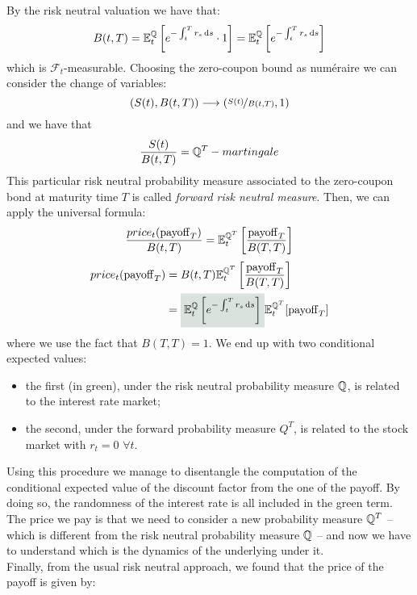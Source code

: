 \medbreak
\noindent By the risk neutral valuation we have that:
\begin{equation}
    B(t,T) = \mathbb{E}^{\mathbb{Q}}_t\left[e^{-\int_t^T r_s\,\dd s}\cdot 1\right] = \mathbb{E}^{\mathbb{Q}}_t\left[e^{-\int_t^T r_s\,\dd s}\right] 
\end{equation}
which is $\mathcal{F}_t$-measurable. Choosing the zero-coupon bound as numéraire we can consider the change of variables:
\begin{equation}
    (S(t), B(t,T)) \longrightarrow (\nicefrac{S(t)}{B(t,T)},1)
\end{equation}
and we have that 
\begin{equation}
    \dfrac{S(t)}{B(t,T)} = \mathbb{Q}^T-martingale
\end{equation}
This particular risk neutral probability measure associated to the zero-coupon bond at maturity time $T$ is called \emph{forward risk neutral measure}. Then, we can apply the universal formula:
\begin{align}
    \frac{price_t(\operatorname{payoff}_T)}{B(t,T)} = \mathbb{E}^{\mathbb{Q}^T}_t\left[\frac{\operatorname{payoff}_T}{B(T,T)}\right] 
\end{align}
\begin{align}
    \notag price_t(\pay_T) &= B(t,T) \mathbb{E}^{\Qmeas^T}_t\left[\frac{\pay_T}{B(T,T)}\right] \\
    &=
    \hlc{mytweed}{\expect_t\left[e^{-\int_t^T r_s\,\dd s}\right]} \mathbb{E}^{\Qmeas^T}_t[\pay_T]
\end{align}
where we use the fact that $B(T,T)=1$. We end up with two conditional expected values:
\begin{itemize}
    \item the first (in green), under the risk neutral probability measure $\mathbb{Q}$, is related to the interest rate market;
    \item the second, under the forward probability measure $Q^T$, is related to the stock market with $r_t = 0$ $\forall t$.
\end{itemize}
Using this procedure we manage to disentangle the computation of the conditional expected value of the discount factor from the one of the payoff. By doing so, the randomness of the interest rate is all included in the green term. The price we pay is that we need to consider a new probability measure $\mathbb{Q}^T$ -- which is different from the risk neutral probability measure $\mathbb{Q}$ -- and now we have to understand which is the dynamics of the underlying under it.\\
Finally, from the usual risk neutral approach, we found that the price of the payoff is given by:
